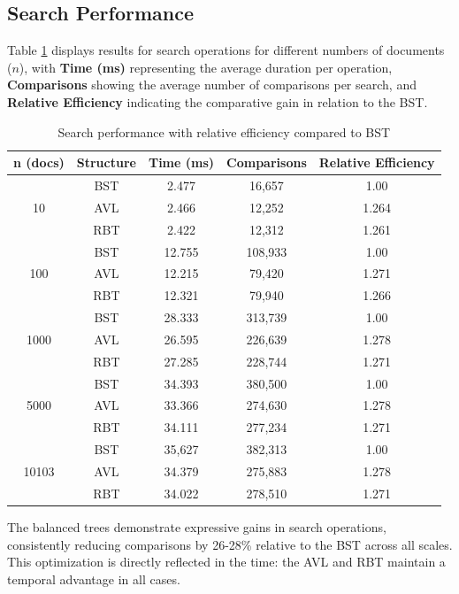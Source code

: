 \subsection{Search Performance}

Table \ref{tab:busca_completa} displays results for search operations for different numbers
of documents ($n$), with \textbf{Time (ms)}
representing the average duration per operation, \textbf{Comparisons} showing the average number of comparisons per search,
and \textbf{Relative Efficiency} indicating the comparative gain in relation to the BST.

\begin{table}[H]
    \centering
    \begin{tabular}{|c|c|c|c|c|}
    \hline
    \textbf{n (docs)} & \textbf{Structure} & \textbf{Time (ms)} & \textbf{Comparisons} & \textbf{Relative Efficiency} \\
    \hline
    \multirow{3}{*}{10} & BST & 2.477 & 16,657 & 1.00 \\
    & AVL & 2.466 & 12,252 & 1.264 \\
    & RBT & 2.422 & 12,312 & 1.261 \\
    \hline
    \multirow{3}{*}{100} & BST & 12.755 & 108,933 & 1.00 \\
    & AVL & 12.215 & 79,420 & 1.271 \\
    & RBT & 12.321 & 79,940 & 1.266 \\
    \hline
    \multirow{3}{*}{1000} & BST & 28.333 & 313,739 & 1.00 \\
    & AVL & 26.595 & 226,639 & 1.278 \\
    & RBT & 27.285 & 228,744 & 1.271 \\
    \hline
    \multirow{3}{*}{5000} & BST & 34.393 & 380,500 & 1.00 \\
    & AVL & 33.366 & 274,630 & 1.278 \\
    & RBT & 34.111 & 277,234 & 1.271 \\
    \hline
    \multirow{3}{*}{10103} & BST & 35,627 & 382,313 & 1.00 \\
    & AVL & 34.379 & 275,883 & 1.278 \\
    & RBT & 34.022 & 278,510 & 1.271 \\
    \hline
    \end{tabular}
    \caption{Search performance with relative efficiency compared to BST}
    \label{tab:busca_completa}
\end{table}

The balanced trees demonstrate expressive gains in search operations, consistently reducing
comparisons by 26-28\% relative to the BST across all scales. This optimization is directly reflected in the time:
the AVL and RBT maintain a temporal advantage in all cases.

